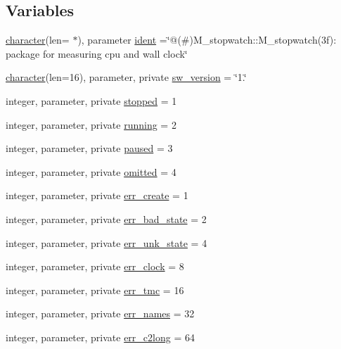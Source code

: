 \subsection*{Variables}
\begin{DoxyCompactItemize}
\item 
\hyperlink{option__stopwatch_83_8txt_abd4b21fbbd175834027b5224bfe97e66}{character}(len= $\ast$), parameter \hyperlink{namespacem__stopwatch_a8c8ff2f2cb941e044ea889e7c728c8eb}{ident} =\char`\"{}@(\#)M\+\_\+stopwatch\+::\+M\+\_\+stopwatch(3f)\+: package for measuring cpu and wall clock\char`\"{}
\item 
\hyperlink{option__stopwatch_83_8txt_abd4b21fbbd175834027b5224bfe97e66}{character}(len=16), parameter, private \hyperlink{namespacem__stopwatch_af92219c7ffaec61677d2eeb5004e598c}{sw\+\_\+version} = \char`\"{}1.\char`\"{}
\item 
integer, parameter, private \hyperlink{namespacem__stopwatch_ab81a5f83e4190cfadc0312bfb82042a8}{stopped} = 1
\item 
integer, parameter, private \hyperlink{namespacem__stopwatch_ae9aaee11cd20802153cf7e880f9d3c3e}{running} = 2
\item 
integer, parameter, private \hyperlink{namespacem__stopwatch_af9caaa877a1be74f00ecbab817ffa65c}{paused} = 3
\item 
integer, parameter, private \hyperlink{namespacem__stopwatch_a1add492246e686a4018076984065cee0}{omitted} = 4
\item 
integer, parameter, private \hyperlink{namespacem__stopwatch_a07067757e5248e34a59473135d6ff491}{err\+\_\+create} = 1
\item 
integer, parameter, private \hyperlink{namespacem__stopwatch_ad3dc0decb1422b8e2226d7f6b86a2994}{err\+\_\+bad\+\_\+state} = 2
\item 
integer, parameter, private \hyperlink{namespacem__stopwatch_afc3962f5eafcda98b0ad803dc1b28cb9}{err\+\_\+unk\+\_\+state} = 4
\item 
integer, parameter, private \hyperlink{namespacem__stopwatch_a885cb53744fec08e407298ee970a4a53}{err\+\_\+clock} = 8
\item 
integer, parameter, private \hyperlink{namespacem__stopwatch_acaa885b35cdc454edb5812b95b18883d}{err\+\_\+tmc} = 16
\item 
integer, parameter, private \hyperlink{namespacem__stopwatch_a337c5ec4e2186142778c2799953e3fe3}{err\+\_\+names} = 32
\item 
integer, parameter, private \hyperlink{namespacem__stopwatch_a6652c14fa8a139ea7b5a9fdd398fc5cc}{err\+\_\+c2long} = 64

\end{DoxyCompactItemize}
